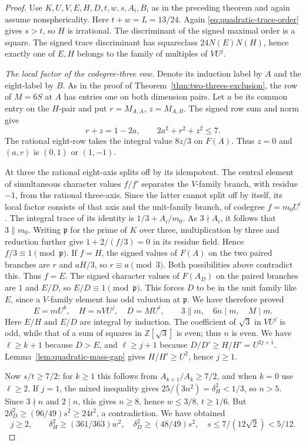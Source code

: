 \documentclass[11pt,reqno]{amsart}
\theoremstyle{remark}\newtheorem{remark}[theorem]{Remark}
\numberwithin{equation}{section}
\begin{document}
\begin{proof}
Use $K,U,V,E,H,D,t,w,s,A_i,B_i$ as in the preceding theorem and again assume nonsphericality. Here $t+w=L=13/24$. Again \eqref{eq:quadratic-trace-order} gives $s>t$, so $H$ is irrational. The discriminant of the signed maximal order is a square. The signed trace discriminant has squareclass $24N(E)N(H)$, hence exactly one of $E,H$ belongs to the family of multiples of $VU^j$.

\emph{The local factor of the codegree-three row.}
Denote its induction label by $A$ and the eight-label by $B$.
As in the proof of Theorem~\ref{thm:two-threes-exclusion}, the row
of $M=6S$ at $A$ has entries one on both dimension pairs.
Let $a$ be its common entry on the $H$-pair and put
$r=M_{A,A}$, $z=M_{A,B}$. The signed row sum and norm give
\[
 r+z=1-2a,\qquad 2a^2+r^2+z^2\le7 .
\]
The rational eight-row takes the integral value $8z/3$ on $F(A)$.
Thus $z=0$ and $(a,r)$ is $(0,1)$ or $(1,-1)$.

At three the rational eight-axis splits off by its idempotent. The central element of simultaneous character values $f/f'$ separates the $V$-family branch, with residue $-1$, from the rational three-axis. Since the latter cannot split off by itself, its local factor consists of that axis and the unit-family branch, of codegree $f=m_0U^i$. The integral trace of its identity is $1/3+A_i/m_0$. As $3\nmid A_i$, it follows that $3\parallel m_0$. Writing $\mathfrak p$ for the prime of $K$ over three, multiplication by three and reduction further give $1+2/(f/3)=0$ in its residue field. Hence $f/3\equiv1\pmod{\mathfrak p}$.
If $f=H$, the signed values of $F(A)$ on the two paired branches are $r$ and $aH/3$, so $r\equiv a\pmod3$. Both possibilities above contradict this. Thus $f=E$. The signed character values of $F(A_D)$ on the paired branches are $1$ and $E/D$, so $E/D\equiv1\pmod{\mathfrak p}$. This forces $D$ to be in the unit family like $E$, since a $V$-family element has odd valuation at $\mathfrak p$. We have therefore proved
\[
 E=mU^k,\quad H=nVU^j,\quad D=MU^\ell,
 \qquad 3\parallel m,\quad 6n\mid m,\quad M\mid m .
\]
Here $E/H$ and $E/D$ are integral by induction. The coefficient of $\sqrt3$ in $VU^j$ is odd, while that of a sum of squares in $\mathbb Z[\sqrt3]$ is even; thus $n$ is even. We have $\ell\ge k+1$ because $D>E$, and $\ell\ge j+1$ because $D/D'\ge H/H'=U^{2j+1}$.
Lemma~\ref{lem:quadratic-mass-gap} gives $H/H'\ge U^2$, hence $j\ge1$.

Now $s/t\ge7/2$: for $k\ge1$ this follows from $A_{k+1}/A_k\ge7/2$, and when $k=0$ use $\ell\ge2$. If $j=1$, the mixed inequality gives $25/(3n^2)=\delta_H^2<1/3$, so $n>5$. Since $3\nmid n$ and $2\mid n$, this gives $n\ge8$, hence $w\le3/8$, $t\ge1/6$. But $2\delta_D^2\ge(96/49)s^2\ge24t^2$, a contradiction. We have obtained
\begin{equation}\label{eq:38-gaps}
 j\ge2,\qquad \delta_H^2\ge(361/363)w^2,\quad
 \delta_D^2\ge(48/49)s^2,\quad
 s\le7/(12\sqrt2)<5/12 .
\end{equation}


\end{proof}
\end{document}
